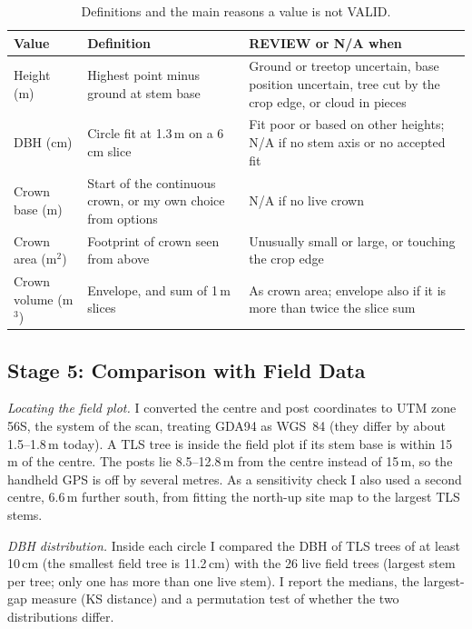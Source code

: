\documentclass[runningheads]{llncs}
\begin{document}
\begin{table}[!tb]
\caption{Definitions and the main reasons a value is not VALID.}\label{tab:methods4}
\centering\footnotesize
\begin{tabular}{@{}L{1.9cm}L{4.1cm}L{4.85cm}@{}}
\toprule
Value & Definition & REVIEW or N/A when\\
\midrule
Height (m) & Highest point minus ground at stem base & Ground or treetop uncertain, base position uncertain, tree cut by the crop edge, or cloud in pieces\\
DBH (cm) & Circle fit at 1.3\,m on a 6\,cm slice & Fit poor or based on other heights; N/A if no stem axis or no accepted fit\\
Crown base (m) & Start of the continuous crown, or my own choice from options & N/A if no live crown\\
Crown area (m$^2$) & Footprint of crown seen from above & Unusually small or large, or touching the crop edge\\
Crown volume (m$^3$) & Envelope, and sum of 1\,m slices & As crown area; envelope also if it is more than twice the slice sum\\
\bottomrule
\end{tabular}
\end{table}

\subsection{Stage 5: Comparison with Field Data}\label{sec:valid}
\emph{Locating the field plot.} I converted the centre and post coordinates to UTM zone 56S, the system of the scan, treating GDA94 as WGS~84 (they differ by about 1.5--1.8\,m today). A TLS tree is inside the field plot if its stem base is within 15\,m of the centre. The posts lie 8.5--12.8\,m from the centre instead of 15\,m, so the handheld GPS is off by several metres. As a sensitivity check I also used a second centre, 6.6\,m further south, from fitting the north-up site map to the largest TLS stems.

\emph{DBH distribution.} Inside each circle I compared the DBH of TLS trees of at least 10\,cm (the smallest field tree is 11.2\,cm) with the 26 live field trees (largest stem per tree; only one has more than one live stem). I report the medians, the largest-gap measure (KS distance) and a permutation test of whether the two distributions differ.
\end{document}
